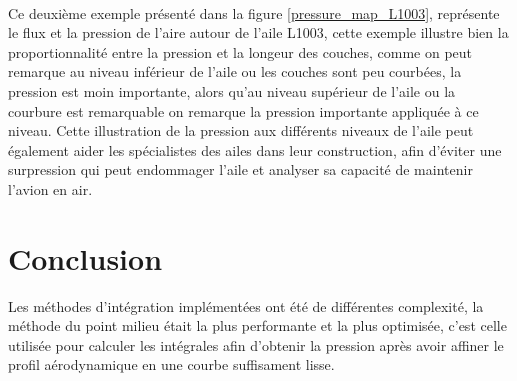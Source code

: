 \documentclass{article}
\begin{document}
\\
\\
\\
\\
\\
\\
Ce deuxième exemple présenté dans la figure \ref{pressure_map_L1003}, représente le flux et la pression de l'aire autour de l'aile L1003, cette exemple illustre bien la proportionnalité entre la pression et la longeur des couches, comme on peut remarque au niveau inférieur de l'aile ou les couches sont peu courbées, la pression est moin importante, alors qu'au niveau supérieur de l'aile ou la courbure est remarquable on remarque la pression importante appliquée à ce niveau. Cette illustration de la pression aux différents niveaux de l'aile peut également aider les spécialistes des ailes dans leur construction, afin d'éviter une surpression qui peut endommager l'aile et analyser sa capacité de maintenir l'avion en air.

\section{Conclusion}
Les méthodes d'intégration implémentées ont été de différentes complexité, la méthode du point milieu était la plus performante et la plus optimisée, c'est celle utilisée pour calculer les intégrales afin d'obtenir la pression après avoir affiner le profil aérodynamique en une courbe suffisament lisse.
\end{document}
